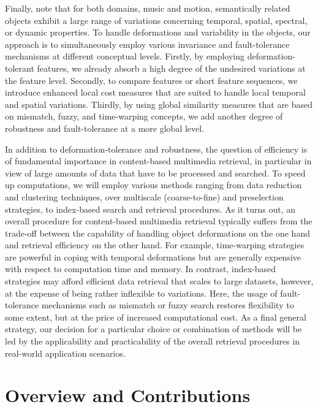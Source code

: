 Finally, note that for both domains, music and motion,
semantically related objects exhibit a large range of variations
concerning temporal, spatial, spectral, or dynamic properties.
To handle deformations and variability in the objects,
our approach is to simultaneously employ various
invariance and fault-tolerance mechanisms at different
conceptual levels.
Firstly, by employing deformation-tolerant features, we already absorb a high
degree of the undesired variations at the feature level.
Secondly, to compare features or short feature sequences,
we introduce enhanced local cost measures that are suited
to handle local temporal and spatial variations.
Thirdly, by using global similarity measures
that are based on mismatch, fuzzy, and time-warping concepts,
we add another degree of robustness and fault-tolerance
at a more global level.

In addition to deformation-tolerance and robustness,
the question of efficiency is of fundamental importance
in content-based multimedia retrieval, in particular in view
of large amounts of data that have to be processed and searched.
To speed up computations, we will employ various methods
ranging from data reduction and clustering techniques,
over multiscale (coarse-to-fine) and preselection strategies,
to index-based search and retrieval procedures.
As it turns out, an overall procedure for content-based multimedia retrieval
typically suffers from the trade-off between the capability of handling
object deformations on the one hand and retrieval efficiency
on the other hand.
For example, time-warping strategies are powerful in coping with
temporal deformations but are generally expensive with respect to
computation time and memory. %
In contrast, index-based strategies may afford efficient data retrieval
that scales to large datasets, however, at the expense of being rather
inflexible to variations.
Here, the usage of fault-tolerance mechanisms such as
mismatch or fuzzy search restores flexibility to some extent,
but at the price of increased computational cost.
As a final general strategy, our decision for a particular choice or
combination of methods will be led by the applicability and practicability
of the overall retrieval procedures in real-world application scenarios.

\section*{Overview and Contributions}


